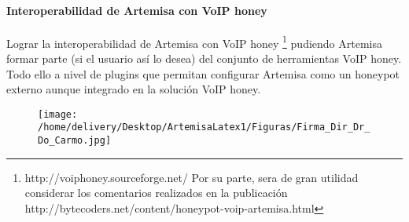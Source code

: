 \documentclass[a4paper,12pt]{report}
\begin{document}
\paragraph{Interoperabilidad de Artemisa con VoIP honey\\}
Lograr la interoperabilidad de Artemisa con VoIP honey \footnote{http://voiphoney.sourceforge.net/ 
Por su parte, sera de gran utilidad considerar los
comentarios realizados en la publicación http://bytecoders.net/content/honeypot-voip-artemisa.html} 
pudiendo Artemisa formar parte (si el usuario así lo desea) del conjunto de herramientas VoIP honey.
Todo ello a nivel de plugins que permitan configurar Artemisa como un honeypot externo aunque
integrado en la solución VoIP honey.

\newpage
\thispagestyle{empty}

\begin{center}
\color{white}{.\\
.\\
.\\
.\\
.\\
.\\
.\\
.\\
.\\
.\\
.\\
.\\
.\\
.\\
.\\
.\\
.\\
.\\
.\\
.\\
.\\
.\\
.\\
.\\
.\\
.\\
}
\end{center}

\begin{figure}[h!] 
\centering
\texttt{[image: /home/delivery/Desktop/ArtemisaLatex1/Figuras/Firma\_Dir\_Dr\_Do\_Carmo.jpg]}
\end{figure}
\end{document}
